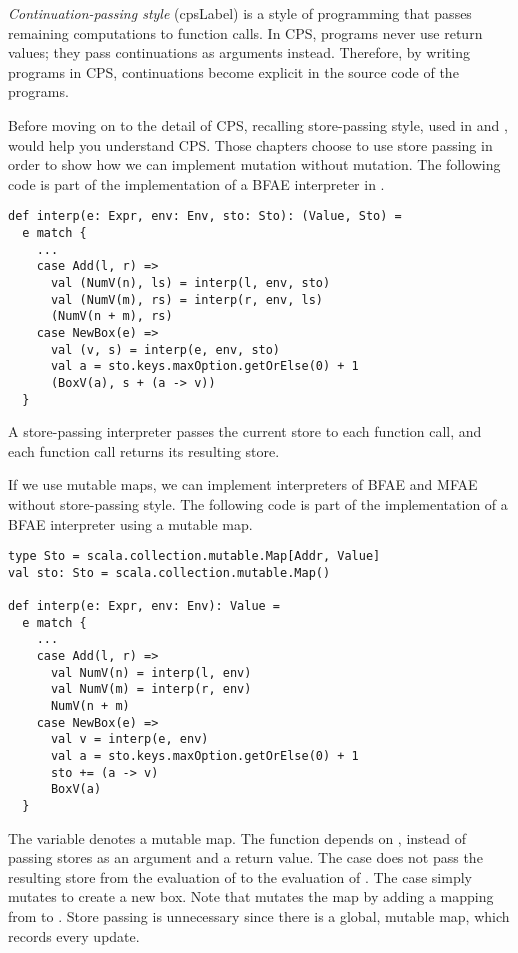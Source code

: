 \textit{Continuation-passing style}
(\acrshort{cpsLabel}) is a style of programming that
passes remaining computations to function calls. In CPS, programs never
use return values; they pass continuations as arguments instead. Therefore, by
writing programs in CPS, continuations become explicit in the source code of the
programs.

Before moving on to the detail of CPS, recalling
store-passing style, used in  and , would help you
understand CPS. Those chapters
choose to use store passing in order to show how we can implement mutation
without mutation. The following code is part of the implementation of a
\textsf{BFAE} interpreter in .
\begin{verbatim}
def interp(e: Expr, env: Env, sto: Sto): (Value, Sto) =
  e match {
    ...
    case Add(l, r) =>
      val (NumV(n), ls) = interp(l, env, sto)
      val (NumV(m), rs) = interp(r, env, ls)
      (NumV(n + m), rs)
    case NewBox(e) =>
      val (v, s) = interp(e, env, sto)
      val a = sto.keys.maxOption.getOrElse(0) + 1
      (BoxV(a), s + (a -> v))
  }
\end{verbatim}
A store-passing interpreter passes the current store to each function call, and
each function call returns its resulting store.

If we use mutable maps, we can implement interpreters of
\textsf{BFAE} and \textsf{MFAE} without store-passing style. The following code
is part of the implementation of a \textsf{BFAE} interpreter using a mutable map.
\begin{verbatim}
type Sto = scala.collection.mutable.Map[Addr, Value]
val sto: Sto = scala.collection.mutable.Map()

def interp(e: Expr, env: Env): Value =
  e match {
    ...
    case Add(l, r) =>
      val NumV(n) = interp(l, env)
      val NumV(m) = interp(r, env)
      NumV(n + m)
    case NewBox(e) =>
      val v = interp(e, env)
      val a = sto.keys.maxOption.getOrElse(0) + 1
      sto += (a -> v)
      BoxV(a)
  }
\end{verbatim}
The variable  denotes a mutable map. The function 
depends on , instead of passing stores as an argument and a return value.
The  case does not pass the resulting store from the evaluation of
 to the evaluation of .
The  case simply mutates  to create a new box.
Note that  mutates the map by adding a mapping from
 to .
Store passing is unnecessary since there is a global, mutable map, which records every update.

